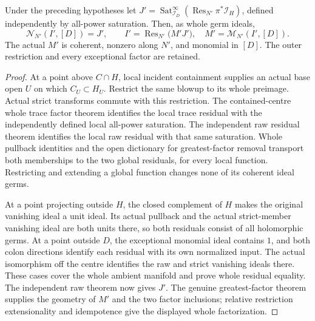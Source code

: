 \begin{theorem}
\label{hir:sharp-actual-incident-centre-trace-residual}
\leanok
Under the preceding hypotheses let
$J'=\operatorname{Sat}_{\mathcal I_D}^{\infty}
(\operatorname{Res}_{N'}\pi^*\mathcal I_H)$, defined independently by
all-power saturation.  Then, as whole germ ideals,
\[
 \mathcal N_{N'}(I',[D])=J',\qquad
 I'=\operatorname{Res}_{N'}\bigl(M'J'\bigr),\quad
 M'=\mathcal M_{N'}(I',[D]).
\]
The actual $M'$ is coherent, nonzero along $N'$, and monomial in $[D]$.
The outer restriction and every exceptional factor are retained.
\end{theorem}
\begin{proof}
At a point above $C\cap H$, local incident containment supplies an actual
base open $U$ on which $C_U\subset H_U$.  Restrict the same blowup to its
whole preimage.  Actual strict transforms commute with this restriction.
The contained-centre whole trace factor theorem identifies the local
trace residual with the independently defined local all-power saturation.
The independent raw residual theorem identifies the local raw residual
with that same saturation.  Whole pullback identities and the open
dictionary for greatest-factor removal transport both memberships to
the two global residuals, for every local function.  Restricting and
extending a global function changes none of its coherent ideal germs.

At a point projecting outside $H$, the closed complement of $H$ makes
the original vanishing ideal a unit ideal.  Its actual pullback and the
actual strict-member vanishing ideal are both units there, so both
residuals consist of all holomorphic germs.  At a point outside $D$,
the exceptional monomial ideal contains $1$, and both colon directions
identify each residual with its own normalized input.  The actual
isomorphism off the centre identifies the raw and strict vanishing
ideals there.  These cases cover the whole ambient manifold and prove
whole residual equality.  The independent raw theorem now gives $J'$.
The genuine greatest-factor theorem supplies the geometry of $M'$ and
the two factor inclusions; relative restriction extensionality and
idempotence give the displayed whole factorization.
\end{proof}

